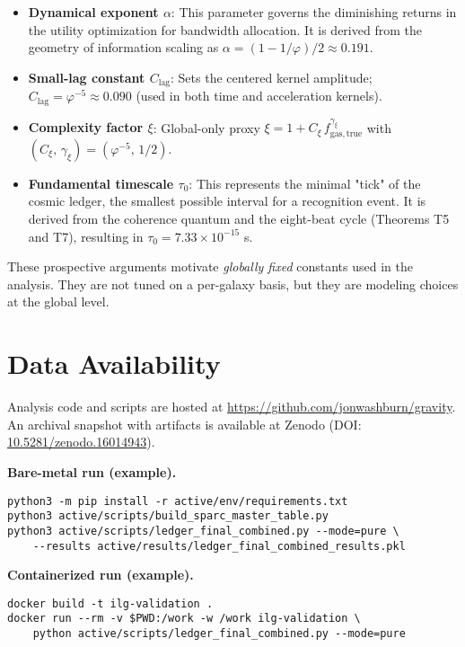 \documentclass[usenatbib]{mnras}
\begin{document}
\begin{itemize}
    \item \textbf{Dynamical exponent $\alpha$}: This parameter governs the diminishing returns in the utility optimization for bandwidth allocation. It is derived from the geometry of information scaling as $\alpha = (1-1/\varphi)/2 \approx 0.191$.
    
    \item \textbf{Small-lag constant $C_\mathrm{lag}$}: Sets the centered kernel amplitude; $C_\mathrm{lag} = \varphi^{-5} \approx 0.090$ (used in both time and acceleration kernels).
    
    \item \textbf{Complexity factor $\xi$}: Global-only proxy $\xi = 1 + C_\xi\, f_\mathrm{gas,true}^{\gamma_\xi}$ with $(C_\xi,\,\gamma_\xi) = (\varphi^{-5},\,1/2)$.
    
    \item \textbf{Fundamental timescale $\tau_0$}: This represents the minimal "tick" of the cosmic ledger, the smallest possible interval for a recognition event. It is derived from the coherence quantum and the eight-beat cycle (Theorems T5 and T7), resulting in $\tau_0 = 7.33 \times 10^{-15}$ s.
\end{itemize}

These prospective arguments motivate \emph{globally fixed} constants used in the analysis. They are not tuned on a per-galaxy basis, but they are modeling choices at the global level.

\section*{Data Availability}
\noindent
Analysis code and scripts are hosted at \href{https://github.com/jonwashburn/gravity}{https://github.com/jonwashburn/gravity}. An archival snapshot with artifacts is available at Zenodo (DOI: \href{https://doi.org/10.5281/zenodo.16014943}{10.5281/zenodo.16014943}).

\noindent\textbf{Bare-metal run (example).}
\begin{lstlisting}
python3 -m pip install -r active/env/requirements.txt
python3 active/scripts/build_sparc_master_table.py
python3 active/scripts/ledger_final_combined.py --mode=pure \
    --results active/results/ledger_final_combined_results.pkl
\end{lstlisting}

\noindent\textbf{Containerized run (example).}
\begin{lstlisting}
docker build -t ilg-validation .
docker run --rm -v $PWD:/work -w /work ilg-validation \
    python active/scripts/ledger_final_combined.py --mode=pure
\end{lstlisting}
\end{document}
